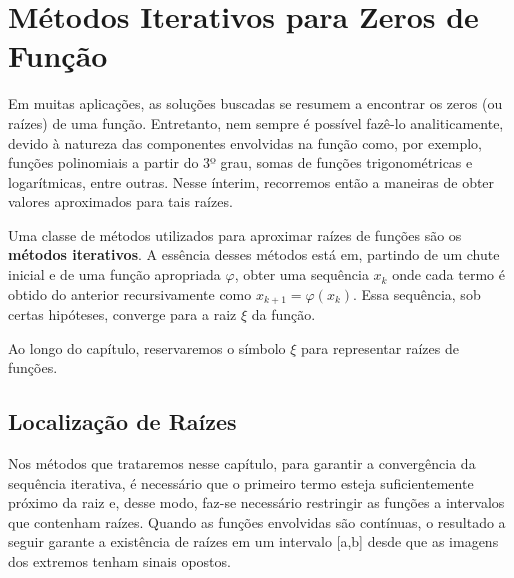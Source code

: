 \chapter{Métodos Iterativos para Zeros de Função}

Em muitas aplicações, as soluções buscadas se resumem a encontrar os zeros (ou raízes) de uma função. Entretanto, nem sempre é possível fazê-lo analiticamente, devido à natureza das componentes envolvidas na função como, por exemplo, funções polinomiais a partir do 3º grau, somas de funções trigonométricas e logarítmicas, entre outras. Nesse ínterim, recorremos então a maneiras de obter valores aproximados para tais raízes. 

Uma classe de métodos utilizados para aproximar raízes de funções são os \textbf{métodos iterativos}. A essência desses métodos está em, partindo de um chute inicial e de uma função apropriada $\varphi$, obter uma sequência $x_k$ onde cada termo é obtido do anterior recursivamente como $x_{k+1} = \varphi(x_k)$. Essa sequência, sob certas hipóteses, converge para a raiz $\xi$ da função.


Ao longo do capítulo, reservaremos o símbolo $\xi$ para representar raízes de funções.

\section{Localização de Raízes}

Nos métodos que trataremos nesse capítulo, para garantir a convergência da sequência iterativa, é necessário que o primeiro termo esteja suficientemente próximo da raiz e, desse modo, faz-se necessário restringir as funções a intervalos que contenham raízes. Quando as funções envolvidas são contínuas, o resultado a seguir garante a existência de raízes em um intervalo [a,b] desde que as imagens dos extremos tenham sinais opostos.

